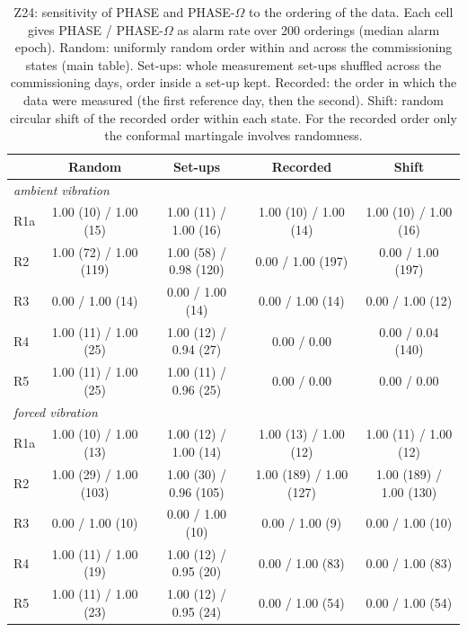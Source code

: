 \documentclass[12pt,a4paper]{article}
\newenvironment{revblock}{}{}
\newenvironment{revblock}{\begingroup\color{revcol}}{\endgroup}
\begin{document}
\begin{revblock}
\begin{table}[t]
\centering
\small
\caption{Z24: sensitivity of PHASE and PHASE-$\Omega$ to the ordering of the data. Each cell gives PHASE / PHASE-$\Omega$ as alarm rate over 200 orderings (median alarm epoch). Random: uniformly random order within and across the commissioning states (main table). Set-ups: whole measurement set-ups shuffled across the commissioning days, order inside a set-up kept. Recorded: the order in which the data were measured (the first reference day, then the second). Shift: random circular shift of the recorded order within each state. For the recorded order only the conformal martingale involves randomness.}
\label{tab:z24order}
\setlength{\tabcolsep}{4pt}
\begin{tabular}{lcccc}
\toprule
 & Random & Set-ups & Recorded & Shift \\
\midrule
\multicolumn{5}{l}{\textit{ambient vibration}}\\
R1a & 1.00 (10) / 1.00 (15) & 1.00 (11) / 1.00 (16) & 1.00 (10) / 1.00 (14) & 1.00 (10) / 1.00 (16) \\
R2 & 1.00 (72) / 1.00 (119) & 1.00 (58) / 0.98 (120) & 0.00 / 1.00 (197) & 0.00 / 1.00 (197) \\
R3 & 0.00 / 1.00 (14) & 0.00 / 1.00 (14) & 0.00 / 1.00 (14) & 0.00 / 1.00 (12) \\
R4 & 1.00 (11) / 1.00 (25) & 1.00 (12) / 0.94 (27) & 0.00 / 0.00 & 0.00 / 0.04 (140) \\
R5 & 1.00 (11) / 1.00 (25) & 1.00 (11) / 0.96 (25) & 0.00 / 0.00 & 0.00 / 0.00 \\
\multicolumn{5}{l}{\textit{forced vibration}}\\
R1a & 1.00 (10) / 1.00 (13) & 1.00 (12) / 1.00 (14) & 1.00 (13) / 1.00 (12) & 1.00 (11) / 1.00 (12) \\
R2 & 1.00 (29) / 1.00 (103) & 1.00 (30) / 0.96 (105) & 1.00 (189) / 1.00 (127) & 1.00 (189) / 1.00 (130) \\
R3 & 0.00 / 1.00 (10) & 0.00 / 1.00 (10) & 0.00 / 1.00 (9) & 0.00 / 1.00 (10) \\
R4 & 1.00 (11) / 1.00 (19) & 1.00 (12) / 0.95 (20) & 0.00 / 1.00 (83) & 0.00 / 1.00 (83) \\
R5 & 1.00 (11) / 1.00 (23) & 1.00 (12) / 0.95 (24) & 0.00 / 1.00 (54) & 0.00 / 1.00 (54) \\
\bottomrule
\end{tabular}
\end{table}


\end{revblock}
\end{document}
